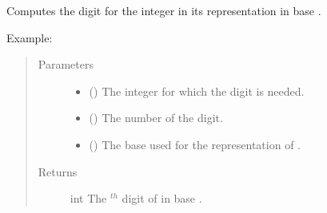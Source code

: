 \documentclass[letterpaper,10pt,english]{sphinxmanual}
\begin{document}
\begin{fulllineitems}
\label{\detokenize{run_circuit:run_circuit.digit}}
Computes the digit  for the integer  in its representation in base
.
\begin{description}
\item[{Example:}] \leavevmode
{}%
\begin{sphinxVerbatim}[commandchars=\\\{\},formatcom=\footnotesize]
 
 
\end{sphinxVerbatim}

\end{description}
\begin{quote}\begin{description}
\item[{Parameters}] \leavevmode\begin{itemize}
\item {} 
 () \textendash{} The integer for which the digit is needed.

\item {} 
 () \textendash{} The number of the digit.

\item {} 
 () \textendash{} The base used for the representation of .

\end{itemize}

\item[{Returns}] \leavevmode
int \textendash{} The  \(^{th}\) digit of  in base .

\end{description}\end{quote}

\end{fulllineitems}
\end{document}
